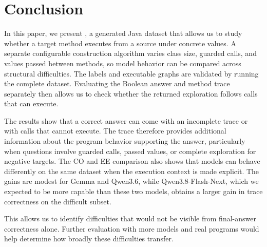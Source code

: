 \section{Conclusion}
\label{sec:conclusion}

In this paper, we present \benchmark, a generated Java dataset that allows us to study whether a target method executes from a source under concrete values. A separate configurable construction algorithm varies class size, guarded calls, and values passed between methods, so model behavior can be compared across structural difficulties. The labels and executable graphs are validated by running the complete dataset. Evaluating the Boolean answer and method trace separately then allows us to check whether the returned exploration follows calls that can execute.

The results show that a correct answer can come with an incomplete trace or with calls that cannot execute. The trace therefore provides additional information about the program behavior supporting the answer, particularly when questions involve guarded calls, passed values, or complete exploration for negative targets. The CO and EE comparison also shows that models can behave differently on the same dataset when the execution context is made explicit. The gains are modest for Gemma and Qwen3.6, while Qwen3.8-Flash-Next, which we expected to be more capable than these two models, obtains a larger gain in trace correctness on the difficult subset.

This allows us to identify difficulties that would not be visible from final-answer correctness alone. Further evaluation with more models and real programs would help determine how broadly these difficulties transfer.
